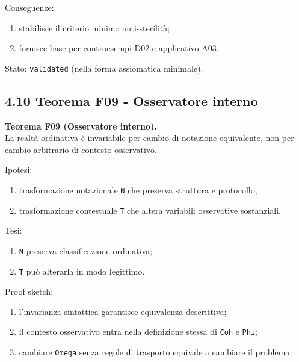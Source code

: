 Conseguenze:

\begin{enumerate}
\def\labelenumi{\arabic{enumi}.}
\tightlist
\item
  stabilisce il criterio minimo anti-sterilità;
\item
  fornisce base per controesempi D02 e applicativo A03.
\end{enumerate}

Stato: \texttt{validated} (nella forma assiomatica minimale).

\subsection{4.10 Teorema F09 - Osservatore interno}

\textbf{Teorema F09 (Osservatore interno).}\\
La realtà ordinativa è invariabile per cambio di notazione equivalente, non per cambio arbitrario di contesto osservativo.

Ipotesi:

\begin{enumerate}
\def\labelenumi{\arabic{enumi}.}
\tightlist
\item
  trasformazione notazionale \texttt{N} che preserva struttura e protocollo;
\item
  trasformazione contestuale \texttt{T} che altera variabili osservative sostanziali.
\end{enumerate}

Tesi:

\begin{enumerate}
\def\labelenumi{\arabic{enumi}.}
\tightlist
\item
  \texttt{N} preserva classificazione ordinativa;
\item
  \texttt{T} può alterarla in modo legittimo.
\end{enumerate}

Proof sketch:

\begin{enumerate}
\def\labelenumi{\arabic{enumi}.}
\tightlist
\item
  l'invarianza sintattica garantisce equivalenza descrittiva;
\item
  il contesto osservativo entra nella definizione stessa di \texttt{Coh} e \texttt{Phi};
\item
  cambiare \texttt{Omega} senza regole di trasporto equivale a cambiare il problema.
\end{enumerate}


